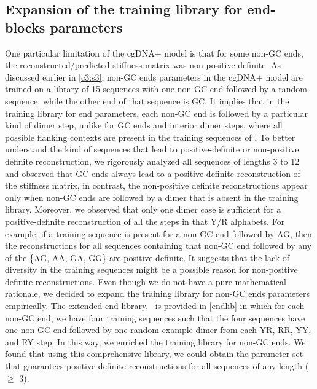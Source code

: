 \subsection{Expansion of the training library for end-blocks parameters}
One particular limitation of the cgDNA$+$ model is that for some non-GC ends, the reconstructed/predicted stiffness matrix was non-positive definite.
As discussed earlier in \cref{c3:s3}, non-GC ends parameters in the cgDNA$+$ model are trained on a library of 15 sequences with one non-GC end followed by a random sequence, while the other end of that sequence is GC.
It implies that in the training library for end parameters, each non-GC end is followed by a particular kind of dimer step, unlike for GC ends and interior dimer steps, where all possible flanking contexts are present in the training sequences of \Lbdna.
To better understand the kind of sequences that lead to positive-definite or non-positive definite reconstruction, we rigorously analyzed all sequences of lengths 3 to 12 and observed that GC ends always lead to a positive-definite reconstruction of the stiffness matrix, in contrast, the non-positive definite reconstructions appear only when non-GC ends are followed by a dimer that is absent in the training library.
Moreover, we observed that only one dimer case is sufficient for a positive-definite reconstruction of all the steps in that Y/R alphabets.
For example, if a training sequence is present for a non-GC end followed by AG, then the reconstructions for all sequences containing that non-GC end followed by any of the \{AG, AA, GA, GG\} are positive definite.
It suggests that the lack of diversity in the training sequences might be a possible reason for non-positive definite reconstructions. 
Even though we do not have a pure mathematical rationale, we decided to expand the training library for non-GC ends parameters empirically. 
The extended end library, \Lbe \ is provided in \cref{endlib} in which for each non-GC end, we have four training sequences such that the four sequences have one non-GC end followed by one random example dimer from each YR, RR, YY, and RY step.
In this way, we enriched the training library for non-GC ends. 
We found that using this comprehensive library, we could obtain the parameter set that guarantees positive definite reconstructions for all sequences of any length ($\geq$ 3).

